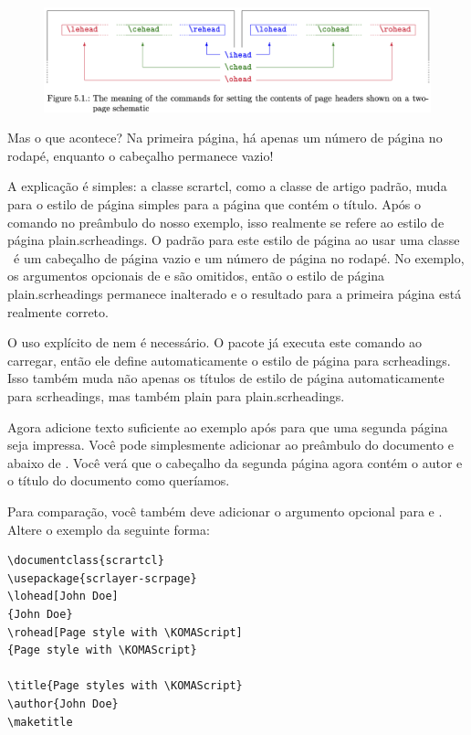 \begin{figure}
    \centering
    \includegraphics[width=1\linewidth]{imagem04.png}
\end{figure}

Mas o que acontece? Na primeira página, há apenas um número de página no rodapé, enquanto o cabeçalho permanece vazio!

A explicação é simples: a classe scrartcl, como a classe de artigo padrão, muda para o estilo de página simples para a página que contém o título. Após o comando  no preâmbulo do nosso exemplo, isso realmente se refere ao estilo de página plain.scrheadings. O padrão para este estilo de página ao usar uma classe \KOMAScript\ é um cabeçalho de página vazio e um número de página no rodapé. No exemplo, os argumentos opcionais de  e  são omitidos, então o estilo de página plain.scrheadings permanece inalterado e o resultado para a primeira página está realmente correto.

O uso explícito de  nem é necessário. O pacote já executa este comando ao carregar, então ele define automaticamente o estilo de página para scrheadings. Isso também muda não apenas os títulos de estilo de página automaticamente para scrheadings, mas também plain para plain.scrheadings.

Agora adicione texto suficiente ao exemplo após  para que uma segunda página seja impressa. Você pode simplesmente adicionar  ao preâmbulo do documento e  abaixo de . Você verá que o cabeçalho da segunda página agora contém o autor e o título do documento como queríamos.

Para comparação, você também deve adicionar o argumento opcional para 
 e . Altere o exemplo da seguinte forma:

\begin{verbatim}
\documentclass{scrartcl}
\usepackage{scrlayer-scrpage}
\lohead[John Doe]
{John Doe}
\rohead[Page style with \KOMAScript]
{Page style with \KOMAScript}

\title{Page styles with \KOMAScript}
\author{John Doe}
\maketitle

\end{verbatim}

